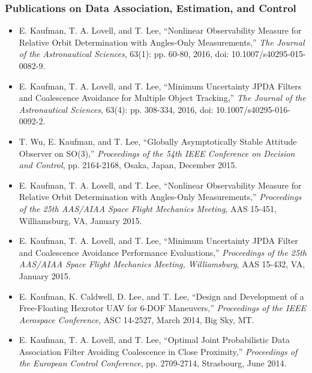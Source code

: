 \documentclass[11pt,professionalfonts,hyperref={pdftex,pdfpagemode=none,pdfstartview=FitH}]{beamer}
\begin{document}
\begin{frame}
\frametitle{Publications on Data Association, Estimation, and Control}
{\tiny 
\begin{itemize}
	\item E. Kaufman, T. A. Lovell, and T. Lee, ``Nonlinear Observability Measure for Relative Orbit Determination with Angles-Only Measurements,'' \textit{The Journal of the Astronautical Sciences}, 63(1): pp. 60-80, 2016, doi: 10.1007/s40295-015-0082-9.
	\item E. Kaufman, T. A. Lovell, and T. Lee, ``Minimum Uncertainty JPDA Filters and Coalescence Avoidance for Multiple Object Tracking,'' \textit{The Journal of the Astronautical Sciences}, 63(4): pp. 308-334, 2016, doi: 10.1007/s40295-016-0092-2.
	\item T. Wu, E. Kaufman, and T. Lee, ``Globally Asymptotically Stable Attitude Observer on SO(3),'' \textit{Proceedings of the 54th IEEE Conference on Decision and Control}, pp. 2164-2168, Osaka, Japan, December 2015.
	\item E. Kaufman, T. A. Lovell, and T. Lee, ``Nonlinear Observability Measure for Relative Orbit Determination with Angles-Only Measurements,'' \textit{Proceedings of the 25th AAS/AIAA Space Flight Mechanics Meeting}, AAS 15-451, Williamsburg, VA, January 2015.
	\item E. Kaufman, T. A. Lovell, and T. Lee, ``Minimum Uncertainty JPDA Filter and Coalescence Avoidance Performance Evaluations,'' \textit{Proceedings of the 25th AAS/AIAA Space Flight Mechanics Meeting, Williamsburg}, AAS 15-432, VA, January 2015.
	\item E. Kaufman, K. Caldwell, D. Lee, and T. Lee, ``Design and Development of a Free-Floating Hexrotor UAV for 6-DOF Maneuvers,'' \textit{Proceedings of the IEEE Aerospace Conference}, ASC 14-2527, March 2014, Big Sky, MT.
	\item E. Kaufman, T. A. Lovell, and T. Lee, ``Optimal Joint Probabilistic Data Association Filter Avoiding Coalescence in Close Proximity,'' \textit{Proceedings of the European Control Conference}, pp. 2709-2714, Strasbourg, June 2014.
\end{itemize}
}
\end{frame}
\end{document}
